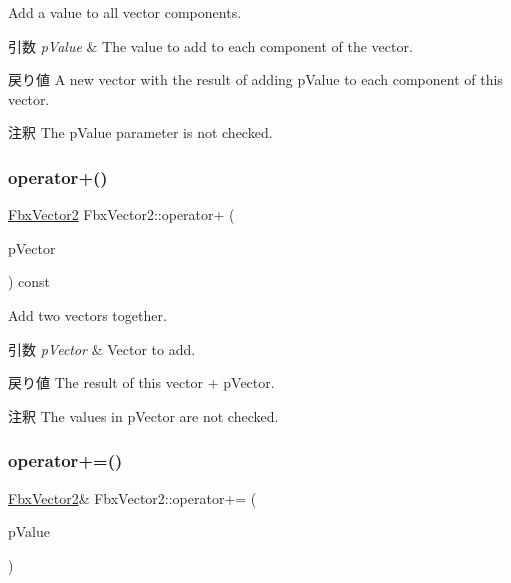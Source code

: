 Add a value to all vector components. 
\begin{DoxyParams}{引数}
{\em p\+Value} & The value to add to each component of the vector. \\
\hline
\end{DoxyParams}
\begin{DoxyReturn}{戻り値}
A new vector with the result of adding p\+Value to each component of this vector. 
\end{DoxyReturn}
\begin{DoxyRemark}{注釈}
The p\+Value parameter is not checked. 
\end{DoxyRemark}
\mbox{\label{class_fbx_vector2_abe1301a610590c2eec654449b2420392}} 
\subsubsection{\texorpdfstring{operator+()}{operator+()}\hspace{0.1cm}{\footnotesize\ttfamily [2/2]}}
{\footnotesize\ttfamily \hyperlink{class_fbx_vector2}{Fbx\+Vector2} Fbx\+Vector2\+::operator+ (\begin{DoxyParamCaption}\item[{const \hyperlink{class_fbx_vector2}{Fbx\+Vector2} \&}]{p\+Vector }\end{DoxyParamCaption}) const}

Add two vectors together. 
\begin{DoxyParams}{引数}
{\em p\+Vector} & Vector to add. \\
\hline
\end{DoxyParams}
\begin{DoxyReturn}{戻り値}
The result of this vector + p\+Vector. 
\end{DoxyReturn}
\begin{DoxyRemark}{注釈}
The values in p\+Vector are not checked. 
\end{DoxyRemark}
\mbox{\label{class_fbx_vector2_a76dca064eec29688ef5ef27be0f6951f}} 
\subsubsection{\texorpdfstring{operator+=()}{operator+=()}\hspace{0.1cm}{\footnotesize\ttfamily [1/2]}}
{\footnotesize\ttfamily \hyperlink{class_fbx_vector2}{Fbx\+Vector2}\& Fbx\+Vector2\+::operator+= (\begin{DoxyParamCaption}\item[{double}]{p\+Value }\end{DoxyParamCaption})}

